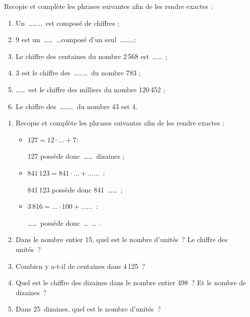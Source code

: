 


\begin{exercice}
Recopie et complète les phrases suivantes afin de les rendre exactes :
\begin{enumerate}
 \item Un \ldots \ldots \ldots est composé de chiffres ;
 \item 9 est un \ldots \ldots \ldots composé d'un seul \ldots \ldots \ldots ;
 \item Le chiffre des centaines du nombre 2\,568 est \ldots \ldots ;
 \item 3 est le chiffre des \ldots \ldots \ldots du nombre 783 ;
 \item \ldots \ldots est le chiffre des milliers du nombre 120\,452 ;
 \item Le chiffre des \ldots \ldots \ldots du nombre 43 est 4.
\end{enumerate}
\end{exercice}


\begin{exercice}
\begin{enumerate}
 \item Recopie et complète les phrases suivantes afin de les rendre exactes :
 \begin{itemize}
  \item $127 = 12 \cdot \ldots + 7$:
  
  127 possède donc \ldots \ldots dizaines ;
  \item $841\,123 = 841 \cdot \ldots + \ldots \ldots$ :
  
  841\,123 possède donc 841 \ldots \ldots ;
  \item $3\,816 = \ldots \cdot 100 + \ldots \ldots$ :
  
  \ldots \ldots possède donc \ldots \ldots .
  \end{itemize}
 \item Dans le nombre entier 15, quel est le nombre d'unités ? Le chiffre des unités ?
 \item Combien y a-t-il de centaines dans 4\,125 ?
 \item Quel est le chiffre des dizaines dans le nombre entier 498 ? Et le nombre de dizaines ?
 \item Dans 25 dizaines, quel est le nombre d'unités ?
 \end{enumerate}
\end{exercice}


